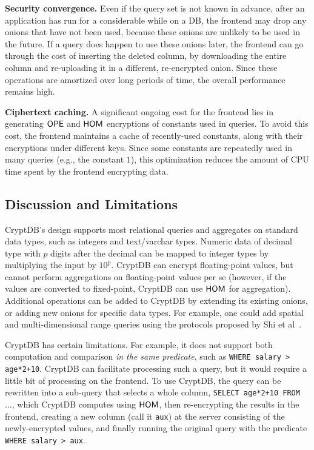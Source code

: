 \textbf{Security convergence.}  Even if the query set is not known in
advance, after an application has run for a considerable while on a DB,
the frontend may drop any onions that have not been used, because these
onions are unlikely to be used in the future.  If a query does happen
to use these onions later, the frontend can go through the cost of
inserting the deleted column, by downloading the entire column and
re-uploading it in a different, re-encrypted onion.  Since these
operations are amortized over long periods of time, the overall
performance remains high.

\textbf{Ciphertext caching.}  A significant ongoing cost for the
frontend lies in generating $\mathsf{OPE}$ and $\mathsf{HOM}$ encryptions of
constants used in queries.  To avoid this cost, the frontend
maintains a cache of recently-used constants, along with their
encryptions under different keys.  Since some constants are
repeatedly used in many queries (e.g., the constant $1$),
this optimization reduces the amount of CPU time spent by
the frontend encrypting data.


\subsection{Discussion and Limitations}

CryptDB's design supports most relational queries and aggregates
on standard data types, such as integers and text/varchar types.
Numeric data of decimal type with $p$ digits after the decimal
can be mapped to integer types by multiplying the input by $10^p$.
CryptDB can encrypt floating-point values, but cannot perform
aggregations on floating-point values per se (however, if the
values are converted to fixed-point, CryptDB can use $\mathsf{HOM}$
for aggregation).
Additional operations can be added to CryptDB by extending its
existing onions, or adding new onions for specific data types.
For example, one could add spatial and multi-dimensional range
queries using the protocols proposed by Shi et al~\cite{multidimRangeQueries}.

CryptDB has certain limitations.  For example, it does not support
both computation and comparison {\em in the same predicate},
such as \texttt{WHERE salary > age*2+10}.
CryptDB can facilitate processing such a query, but it would require
a little bit of processing on the frontend.
To use CryptDB, the query can be rewritten into a sub-query that
selects a whole column, \texttt{SELECT age*2+10 FROM $\ldots$},
which CryptDB computes using $\mathsf{HOM}$, then re-encrypting the
results in the frontend, creating a new column (call it {\tt aux})
at the server consisting of the newly-encrypted values, and finally
running the original query with the predicate {\tt WHERE salary > aux}.

